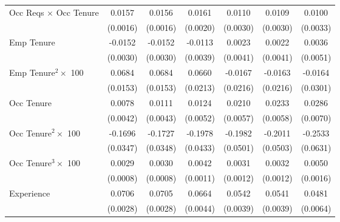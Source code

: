 {\begin{longtable}{l*{6}{c}}
Occ Reqs $\times$ Occ Tenure&      0.0157\sym{***}&      0.0156\sym{***}&      0.0161\sym{***}&      0.0110\sym{***}&      0.0109\sym{***}&      0.0100\sym{***}\\
                    &    (0.0016)         &    (0.0016)         &    (0.0020)         &    (0.0030)         &    (0.0030)         &    (0.0033)         \\
Emp Tenure          &     -0.0152\sym{***}&     -0.0152\sym{***}&     -0.0113\sym{***}&      0.0023         &      0.0022         &      0.0036         \\
                    &    (0.0030)         &    (0.0030)         &    (0.0039)         &    (0.0041)         &    (0.0041)         &    (0.0051)         \\
Emp Tenure$^2\times$ 100&      0.0684\sym{***}&      0.0684\sym{***}&      0.0660\sym{***}&     -0.0167         &     -0.0163         &     -0.0164         \\
                    &    (0.0153)         &    (0.0153)         &    (0.0213)         &    (0.0216)         &    (0.0216)         &    (0.0301)         \\
Occ Tenure          &      0.0078\sym{*}  &      0.0111\sym{**} &      0.0124\sym{**} &      0.0210\sym{***}&      0.0233\sym{***}&      0.0286\sym{***}\\
                    &    (0.0042)         &    (0.0043)         &    (0.0052)         &    (0.0057)         &    (0.0058)         &    (0.0070)         \\
Occ Tenure$^2\times$ 100&     -0.1696\sym{***}&     -0.1727\sym{***}&     -0.1978\sym{***}&     -0.1982\sym{***}&     -0.2011\sym{***}&     -0.2533\sym{***}\\
                    &    (0.0347)         &    (0.0348)         &    (0.0433)         &    (0.0501)         &    (0.0503)         &    (0.0631)         \\
Occ Tenure$^3\times$ 100&      0.0029\sym{***}&      0.0030\sym{***}&      0.0042\sym{***}&      0.0031\sym{**} &      0.0032\sym{**} &      0.0050\sym{***}\\
                    &    (0.0008)         &    (0.0008)         &    (0.0011)         &    (0.0012)         &    (0.0012)         &    (0.0016)         \\
Experience          &      0.0706\sym{***}&      0.0705\sym{***}&      0.0664\sym{***}&      0.0542\sym{***}&      0.0541\sym{***}&      0.0481\sym{***}\\
                    &    (0.0028)         &    (0.0028)         &    (0.0044)         &    (0.0039)         &    (0.0039)         &    (0.0064)         \\

\end{longtable}}
